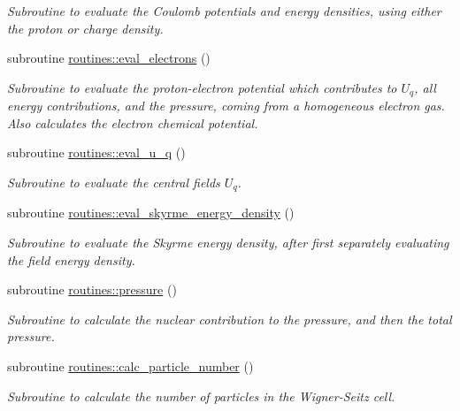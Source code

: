 \begin{DoxyCompactItemize}
\begin{DoxyCompactList}\small\item\em Subroutine to evaluate the Coulomb potentials and energy densities, using either the proton or charge density. \end{DoxyCompactList}\item 
subroutine \mbox{\hyperlink{namespaceroutines_a0b55cc503c7168299be63556e2602bd0}{routines\+::eval\+\_\+electrons}} ()
\begin{DoxyCompactList}\small\item\em Subroutine to evaluate the proton-\/electron potential which contributes to $U_q$, all energy contributions, and the pressure, coming from a homogeneous electron gas. Also calculates the electron chemical potential. \end{DoxyCompactList}\item 
subroutine \mbox{\hyperlink{namespaceroutines_a6ee5e5cd7ce81b013d18b19f5f9a4092}{routines\+::eval\+\_\+u\+\_\+q}} ()
\begin{DoxyCompactList}\small\item\em Subroutine to evaluate the central fields $U_q$. \end{DoxyCompactList}\item 
subroutine \mbox{\hyperlink{namespaceroutines_ae210968d134fbcc79297971cc4fefb82}{routines\+::eval\+\_\+skyrme\+\_\+energy\+\_\+density}} ()
\begin{DoxyCompactList}\small\item\em Subroutine to evaluate the Skyrme energy density, after first separately evaluating the field energy density. \end{DoxyCompactList}\item 
subroutine \mbox{\hyperlink{namespaceroutines_a383e2bf5a1fa37fbf95dd5f6ddbcc6be}{routines\+::pressure}} ()
\begin{DoxyCompactList}\small\item\em Subroutine to calculate the nuclear contribution to the pressure, and then the total pressure. \end{DoxyCompactList}\item 
subroutine \mbox{\hyperlink{namespaceroutines_a0b8346e8e5457d6befb48b0ac56f4fdf}{routines\+::calc\+\_\+particle\+\_\+number}} ()
\begin{DoxyCompactList}\small\item\em Subroutine to calculate the number of particles in the Wigner-\/\+Seitz cell. \end{DoxyCompactList}\item 

\end{DoxyCompactItemize}
